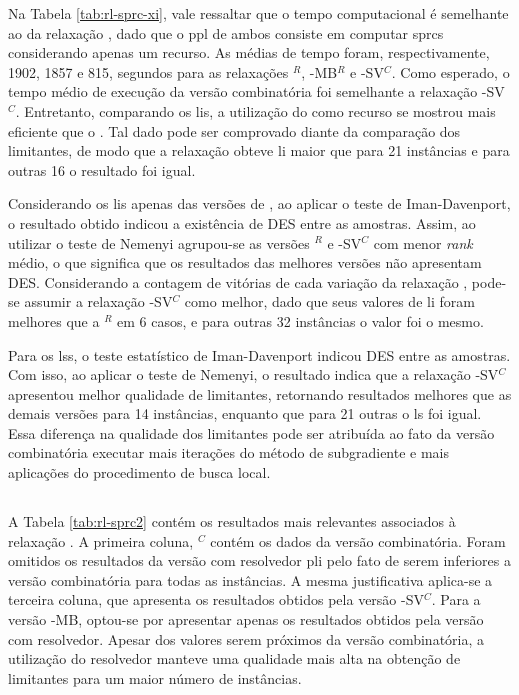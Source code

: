 Na  Tabela \ref{tab:rl-sprc-xi},  vale  ressaltar que  o  tempo computacional  é
semelhante ao  da relaxação {\rld},  dado que o  \gls{ppl} de ambos  consiste em
computar \gls{sprc}s considerando  apenas um recurso. As médias  de tempo foram,
respectivamente, 1902,  1857 e  815, segundos  para as  relaxações {\rlt}$^{R}$,
{\rlt}-MB$^{R}$ e {\rlt}-SV$^{C}$.  Como esperado, o tempo médio  de execução da
versão  combinatória foi  semelhante  a  relaxação {\rld}-SV$^{C}$.  Entretanto,
comparando os \gls{li}s, a utilização do  {\jitter} como recurso se mostrou mais
eficiente que o {\delay}. Tal dado  pode ser comprovado diante da comparação dos
limitantes, de modo que a relaxação {\rlt} obteve \gls{li} maior que {\rld} para
21 instâncias e para outras 16 o resultado foi igual.

Considerando os  \gls{li}s apenas das versões  de {\rlt}, ao aplicar  o teste de
Iman-Davenport,  o  resultado  obtido  indicou  a existência  de  DES  entre  as
amostras. Assim, ao utilizar o teste de Nemenyi agrupou-se as versões {\rlt}$^R$
e {\rlt}-SV$^C$  com menor {\em rank}  médio, o que significa  que os resultados
das melhores versões não apresentam DES.  Considerando a contagem de vitórias de
cada variação da  relaxação {\rlt}, pode-se assumir  a relaxação {\rlt}-SV$^{C}$
como melhor, dado  que seus valores de \gls{li} foram  melhores que a {\rlt}$^R$
em 6 casos, e para outras 32 instâncias o valor foi o mesmo.

Para os  \gls{ls}s, o teste estatístico  de Iman-Davenport indicou DES  entre as
amostras. Com  isso, ao  aplicar o teste  de Nemenyi, o  resultado indica  que a
relaxação {\rld}-SV$^C$  apresentou melhor  qualidade de  limitantes, retornando
resultados melhores que as demais versões  para 14 instâncias, enquanto que para
21 outras o \gls{ls} foi igual.  Essa diferença na qualidade dos limitantes pode
ser atribuída ao  fato da versão combinatória executar mais  iterações do método
de subgradiente e mais aplicações do procedimento de busca local.

\subsection{\rlq}

A Tabela  \ref{tab:rl-sprc2} contém os  resultados mais relevantes  associados à
relaxação  {\rlq}. A  primeira  coluna,  {\rlq}$^C$ contém  os  dados da  versão
combinatória. Foram  omitidos os resultados  da versão com  resolvedor \gls{pli}
pelo fato de serem inferiores a  versão combinatória para todas as instâncias. A
mesma justificativa  aplica-se a  terceira coluna,  que apresenta  os resultados
obtidos  pela versão  {\rlq}-SV$^{C}$.  Para a  versão  {\rlq}-MB, optou-se  por
apresentar apenas os  resultados obtidos pela versão com  resolvedor. Apesar dos
valores  serem  próximos da  versão  combinatória,  a utilização  do  resolvedor
manteve uma qualidade  mais alta na obtenção de limitantes  para um maior número
de instâncias.

